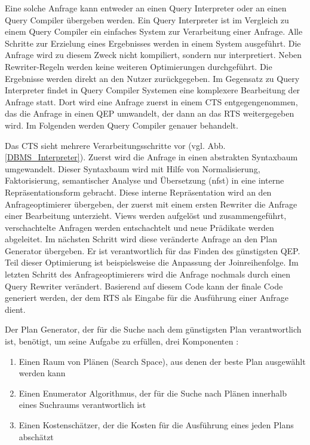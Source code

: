 Eine solche Anfrage kann entweder an einen Query Interpreter oder an einen Query Compiler übergeben werden. Ein Query Interpreter ist im Vergleich zu einem Query Compiler ein einfaches System zur Verarbeitung einer Anfrage. Alle Schritte zur Erzielung eines Ergebnisses werden in einem System ausgeführt. Die Anfrage wird zu diesem Zweck nicht kompiliert, sondern nur interpretiert. Neben Rewriter-Regeln werden keine weiteren Optimierungen durchgeführt. Die Ergebnisse werden direkt an den Nutzer zurückgegeben. Im Gegensatz zu Query Interpreter findet in Query Compiler Systemen eine komplexere Bearbeitung der Anfrage statt. Dort wird eine Anfrage zuerst in einem \ac{CTS} entgegengenommen, das die Anfrage in einen \ac{QEP} umwandelt, der dann an das \ac{RTS} weitergegeben wird. Im Folgenden werden Query Compiler genauer behandelt.






Das \ac{CTS} sieht mehrere Verarbeitungsschritte vor (vgl. Abb. \ref{DBMS_Interpreter}). Zuerst wird die Anfrage in einen abstrakten Syntaxbaum umgewandelt. Dieser Syntaxbaum wird mit Hilfe von Normalisierung, Faktorisierung, semantischer Analyse und Übersetzung (nfst) in eine interne Repräsentationsform gebracht. Diese interne Repräsentation wird an den Anfrageoptimierer übergeben, der zuerst mit einem ersten Rewriter die Anfrage einer Bearbeitung unterzieht. Views werden aufgelöst und zusammengeführt, verschachtelte Anfragen werden entschachtelt und neue Prädikate werden abgeleitet. Im nächsten Schritt wird diese veränderte Anfrage an den Plan Generator übergeben. Er ist verantwortlich für das Finden des günstigsten \ac{QEP}. Teil dieser Optimierung ist beispielsweise die Anpassung der Joinreihenfolge. Im letzten Schritt des Anfrageoptimierers wird die Anfrage nochmals durch einen Query Rewriter verändert. Basierend auf diesem Code kann der finale Code generiert werden, der dem \ac{RTS} als Eingabe für die Ausführung einer Anfrage dient.


Der Plan Generator, der für die Suche nach dem günstigsten Plan verantwortlich ist, benötigt, um seine Aufgabe zu erfüllen, drei Komponenten \cite{chaudhuri1998overview}: 

\begin{enumerate}
\item Einen Raum von Plänen (Search Space), aus denen der beste Plan ausgewählt werden kann
\item Einen Enumerator Algorithmus, der für die Suche nach Plänen innerhalb eines Suchraums verantwortlich ist
\item Einen Kostenschätzer, der die Kosten für die Ausführung eines jeden Plans abschätzt
\end{enumerate}
